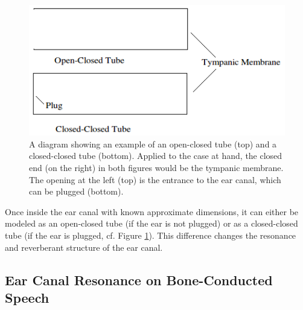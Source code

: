 \DIFdelbegin %
\DIFdelend \DIFaddbegin \begin{figure}[h!]
\DIFaddendFL \centering
  \includegraphics{figure/open-closed-tube.png}
  \caption{A diagram showing an example of an open-closed tube (top) and a closed-closed tube (bottom).  Applied to the case at hand, the closed end (on the right) in both figures would be the tympanic membrane.  The opening at the left (top) is the entrance to the ear canal, which can be plugged (bottom).}
  \label{fig:open-closed-tube}
\end{figure}

Once inside the ear canal with known approximate dimensions, it can either be modeled as an open-closed tube (if the ear is not plugged) or as a closed-closed tube (if the ear is plugged, cf. Figure \ref{fig:open-closed-tube}). This difference changes the resonance and reverberant structure of the ear canal\DIFaddbegin {}\DIFaddend .  

\DIFdelbegin %
\DIFdelend \DIFaddbegin \subsection{Ear Canal Resonance on Bone-Conducted Speech}
\DIFaddend 

